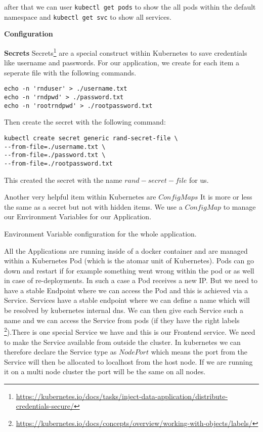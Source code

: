 after that we can user \texttt{kubectl get pods} to show the all pods within the default namespace and \texttt{kubectl get svc} to show all services.


\textbf{Configuration}

\textbf{Secrets}
Secrets\footnote{\url{https://kubernetes.io/docs/tasks/inject-data-application/distribute-credentials-secure/}} are a special construct within Kubernetes to save credentials like username and passwords. 
For our application, we create for each item a seperate file with the following commands.
\begin{verbatim}
echo -n 'rnduser' > ./username.txt
echo -n 'rndpwd' > ./password.txt
echo -n 'rootrndpwd' > ./rootpassword.txt
\end{verbatim}

Then create the secret with the following command:
\begin{verbatim}
kubectl create secret generic rand-secret-file \
--from-file=./username.txt \
--from-file=./password.txt \
--from-file=./rootpassword.txt
\end{verbatim}

This created the secret with the name $rand-secret-file$ for us.

Another very helpful item within Kubernetes are $Config Maps$ It is more or less the same as a secret but not with hidden items.
We use a $Config Map$ to manage our Environment Variables for our Application.

Environment Variable configuration for the whole application.


All the Applications are running inside of a docker container and are managed within a Kubernetes Pod (which is the atomar unit of Kubernetes). Pods can go down and restart if for example something went wrong within the pod or as well in case of re-deployments. In such a case a Pod receives a new IP. But we need to have a stable Endpoint where we can access the Pod and this is achieved via a Service. Services have a stable endpoint where we can define a name which will be resolved by kubernetes internal dns. We can then give each Service such a name and we can access the Service from pods (if they have the right labels \footnote{\url{https://kubernetes.io/docs/concepts/overview/working-with-objects/labels/}}).There is one special Service we have and this is our Frontend service. We need to make the Service available from outside the cluster. In kubernetes we can therefore declare the Service type as $NodePort$ which means the port from the Service will then be allocated to localhost from the host node. If we are running it on a multi node cluster the port will be the same on all nodes.

